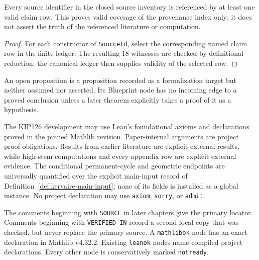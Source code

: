 \begin{theorem}
  \label{thm:source-coverage-by-claims}
  \leanok
  Every source identifier in the closed source inventory is referenced by at
  least one valid claim row.  This proves valid coverage of the provenance
  index only; it does not assert the truth of the referenced literature or
  computation.
\end{theorem}

\begin{proof}
  For each constructor of \texttt{SourceId}, select the corresponding named claim
  row in the finite ledger.  The resulting 18 witnesses are checked by
  definitional reduction; the canonical ledger then supplies validity of the
  selected row.
  \leanok
\end{proof}

\begin{definition}
  \label{def:open-proposition}
  \notready
  An open proposition is a proposition recorded as a formalization target but
  neither assumed nor asserted.  Its Blueprint node has no incoming edge to a
  proved conclusion unless a later theorem explicitly takes a proof of it as
  a hypothesis.
\end{definition}

\begin{definition}
  \label{def:kip126-trust-boundary}
  \notready
  The KIP126 development may use Lean's foundational axioms and declarations
  proved in the pinned Mathlib revision.  Paper-internal arguments are project
  proof obligations.  Results from earlier literature are explicit external
  results, while high-stem computations and every appendix row are explicit
  external evidence.  The conditional permanent-cycle and geometric endpoints
  are universally quantified over the explicit main-input record of
  Definition~\ref{def:kervaire-main-input}; none of its fields is installed as
  a global instance.  No project declaration may use \texttt{axiom},
  \texttt{sorry}, or \texttt{admit}.
\end{definition}

The comments beginning with \texttt{SOURCE} in later chapters give the primary
locator.  Comments beginning with \texttt{VERIFIED-IN} record a second local
copy that was checked, but never replace the primary source.  A
\texttt{mathlibok} node has an exact declaration in Mathlib v4.32.2.  Existing
\texttt{leanok} nodes name compiled project declarations.  Every other node is
conservatively marked \texttt{notready}.
